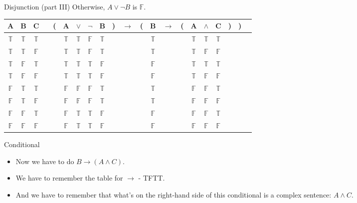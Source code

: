 \documentclass[
  ignorenonframetext,
]{beamer}
\providecommand{\tightlist}{%
  \setlength{\itemsep}{0pt}\setlength{\parskip}{0pt}}
\renewcommand{\,}{\text{, }}
\def\True{\mathbb{T}}
\def\False{\mathbb{F}}
\begin{document}
\begin{frame}{Disjunction (part III)}
\protect\hypertarget{disjunction-part-iii}{}
Otherwise, \(A \vee \neg B\) is \(\False\).

\begin{center}
\begin{tabular}{@{ }c@{ }@{ }c@{ }@{ }c | c@{ }@{}c@{}@{ }c@{ }@{ }c@{ }@{ }c@{ }@{ }c@{ }@{}c@{}@{ }c@{ }@{}c@{}@{ }c@{ }@{ }c@{ }@{}c@{}@{ }c@{ }@{ }c@{ }@{ }c@{ }@{}c@{}@{}c@{}@{ }c}
A & B & C &  & ( & A & $\vee$ & $\neg$ & B & ) & $\rightarrow$ & ( & B & $\rightarrow$ & ( & A & $\wedge$ & C & ) & ) & \\
\hline 
 $\True$ & $\True$ & $\True$ &  &  & $\True$ & $\True$ & $\False$ & $\True$ &  &&  & $\True$ &&  & $\True$ & $\True$ & $\True$ &  &  & \\
 $\True$ & $\True$ & $\False$ &  &  & $\True$ & $\True$ & $\False$ & $\True$ &  &&  & $\True$ &&  & $\True$ & $\False$ & $\False$ &  &  & \\
 $\True$ & $\False$ & $\True$ &  &  & $\True$ & $\True$ & $\True$ & $\False$ &  &&  & $\False$ &&  & $\True$ & $\True$ & $\True$ &  &  & \\
 $\True$ & $\False$ & $\False$ &  &  & $\True$ & $\True$ & $\True$ & $\False$ &  &&  & $\False$ &&  & $\True$ & $\False$ & $\False$ &  &  & \\
 $\False$ & $\True$ & $\True$ &  &  & $\False$ & $\False$ & $\False$ & $\True$ &  &&  & $\True$ &&  & $\False$ & $\False$ & $\True$ &  &  & \\
 $\False$ & $\True$ & $\False$ &  &  & $\False$ & $\False$ & $\False$ & $\True$ &  &&  & $\True$ &&  & $\False$ & $\False$ & $\False$ &  &  & \\
 $\False$ & $\False$ & $\True$ &  &  & $\False$ & $\True$ & $\True$ & $\False$ &  &&  & $\False$ &&  & $\False$ & $\False$ & $\True$ &  &  & \\
 $\False$ & $\False$ & $\False$ &  &  & $\False$ & $\True$ & $\True$ & $\False$ &  &&  & $\False$ &&  & $\False$ & $\False$ & $\False$ &  &  & \\
\end{tabular}
\end{center}
\end{frame}

\begin{frame}{Conditional}
\protect\hypertarget{conditional}{}
\begin{itemize}
\tightlist
\item
  Now we have to do \(B \rightarrow (A \wedge C)\).
\item
  We have to remember the table for \(\rightarrow\) - TFTT.
\item
  And we have to remember that what's on the right-hand side of this
  conditional is a complex sentence: \(A \wedge C\).
\end{itemize}
\end{frame}
\end{document}

